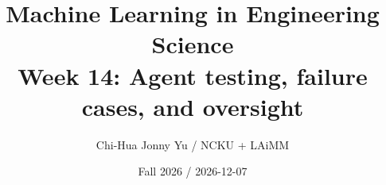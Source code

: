 \documentclass[11pt,oneside]{book}
\begin{document}
\title{Machine Learning in Engineering Science\\\large Week 14: Agent testing, failure cases, and oversight}\author{Chi-Hua Jonny Yu / NCKU + LAiMM}\date{Fall 2026 / 2026-12-07}\maketitle

\end{document}

